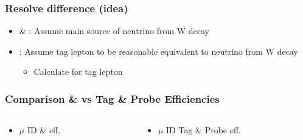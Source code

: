 \documentclass{beamer}
\begin{document}
\begin{frame}
 \frametitle{Resolve difference (idea)}
 \begin{itemize}
  \item \ttbar \& \wpj: Assume main source of \MHT neutrino from W decay
  \item \Zll: Assume tag lepton to be reasonable equivalent to neutrino from W decay
  \begin{itemize}
   \item Calculate \mindeltaphi for tag lepton \pt
  \end{itemize}
 \end{itemize}
\end{frame}
\begin{frame}
 \frametitle{Comparison \ttbar \& \wpj vs Tag \& Probe Efficiencies}
  \begin{columns}

   \begin{column}{0.50\textwidth}
     \begin{itemize}
   \item $\mu$ ID \ttbar \& \wpj eff.
  \end{itemize}
   \end{column}
   \begin{column}{0.50\textwidth}
   \begin{itemize}
    \item $\mu$ ID Tag \& Probe eff.
   \end{itemize}


\end{column}
\end{columns}
\end{frame}
\end{document}
